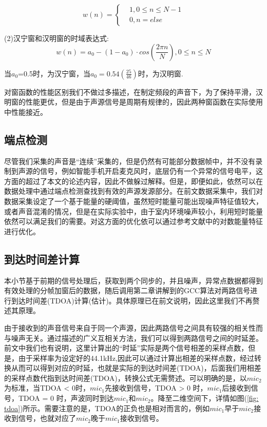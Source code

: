 \documentclass[winfonts,oneside]{njuthesis}
\begin{document}
			\begin{equation}
				w(n)=\left\{
				\begin{aligned}
					&1, 0\leq n \leq N - 1\\
					&0, n = else
				\end{aligned}
				\right.
			\end{equation}
			
			
			(2)汉宁窗和汉明窗的时域表达式:
			\begin{equation}
				w(n)=a_0-(1-a_0)\cdot cos(\frac{2\pi n}{N}), 0 \leq n \leq N
			\end{equation}
			
			当$a_0$=0.5时，为汉宁窗，当$a_0=0.54(\frac{25}{46})$时，为汉明窗.
			
			对窗函数的性能区别我们不做过多描述，在制定频段的声音下，为了保持平滑，汉明窗的性能更优，但是由于声源信号是周期有规律的，因此两种窗函数在实际使用中性能接近。
			
			
		\subsection{端点检测}
		
			尽管我们采集的声音是“连续”采集的，但是仍然有可能部分数据帧中，并不没有录制到声源的信号，例如智能手机开启麦克风时，底层仍有一个异常的信号电平，这方面的超过了本文的论述内容，因此不做躲过解释。但是，即便如此，依然可以在数据处理中通过端点检测查找到有效的声源发源部分。在前文数据采集中，我们对数据采集设定了一个基于能量的硬阈值，虽然短时能量可能出现噪声特征值较大，或者声音混淆的情况，但是在实际实验中，由于室内环境噪声较小，利用短时能量依然可以满足我们的需要。对这方面的优化依可以通过参考文献\cite{Endpoint_detection}中的对数能量特征进行优化。
		
		\subsection{到达时间差计算}
			
			本小节基于前期的信号处理后，获取到两个同步的，并且噪声，异常点数据都得到有效处理的分帧加窗后的数据，随后调用第二章讲解到的GCC算法对两路信号进行到达时间差(TDOA)计算(估计)。具体原理已在前文说明，因此这里我们不再赘述其原理。
			
			由于接收到的声音信号来自于同一个声源，因此两路信号之间具有较强的相关性而与噪声无关。通过描述的广义互相关方法，我们可以得到两路信号之间的时延差。前文中我们也有说明，这里计算出的“时延”实际是两个信号相差的采样点数，但是，由于采样率为设定好的44.1kHz,因此可以通过计算出相差的采样点数，经过转换从而可以得到对应的时延，也就是实际的到达时间差(TDOA)，后面我们用相差的采样点数代指到达时间差(TDOA)，转换公式无需赘述。可以明确的是，以$mic_2$为标准，当TDOA < 0时，$mic_1$先接收到信号，TDOA > 0 时，$mic_1$后接收到信号，TDOA = 0 时，声波同时到达$mic_1$和$mic_2$。降至二维空间下，详情如图(\ref{fig: tdoa})所示。需要注意的是，TDOA的正负也是相对而言的，例如$mic_1$早于$mic_2$接收到信号，也就对应了$mic_2$晚于$mic_1$接收到信号。
			
\end{document}
